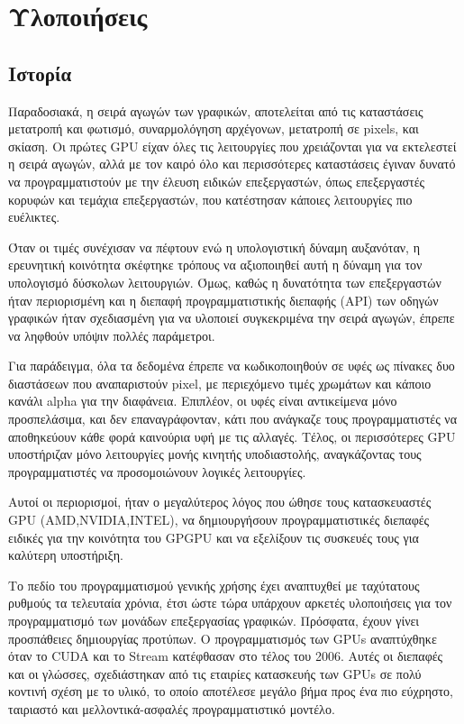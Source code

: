 \chapter{Υλοποιήσεις}
\section{Ιστορία}
Παραδοσιακά, η σειρά αγωγών των γραφικών, αποτελείται από τις καταστάσεις μετατροπή και φωτισμό, συναρμολόγηση αρχέγονων, μετατροπή σε pixels, και σκίαση. Οι πρώτες GPU είχαν όλες τις λειτουργίες που χρειάζονται για να εκτελεστεί η σειρά αγωγών, αλλά με τον καιρό όλο και περισσότερες καταστάσεις έγιναν δυνατό να προγραμματιστούν με την έλευση ειδικών επεξεργαστών, όπως επεξεργαστές κορυφών και τεμάχια επεξεργαστών, που κατέστησαν κάποιες λειτουργίες πιο ευέλικτες.

Όταν οι τιμές συνέχισαν να πέφτουν ενώ η υπολογιστική δύναμη αυξανόταν, η ερευνητική κοινότητα σκέφτηκε τρόπους να αξιοποιηθεί αυτή η δύναμη για τον υπολογισμό δύσκολων λειτουργιών. Όμως, καθώς η δυνατότητα των επεξεργαστών ήταν περιορισμένη και η διεπαφή προγραμματιστικής διεπαφής (API) των οδηγών γραφικών ήταν σχεδιασμένη για να υλοποιεί συγκεκριμένα την σειρά αγωγών, έπρεπε να ληφθούν υπόψιν πολλές παράμετροι.

Για παράδειγμα, όλα τα δεδομένα έπρεπε να κωδικοποιηθούν σε υφές ως πίνακες δυο διαστάσεων που αναπαριστούν pixel, με περιεχόμενο τιμές χρωμάτων και κάποιο κανάλι alpha για την διαφάνεια. Επιπλέον, οι υφές είναι αντικείμενα μόνο προσπελάσιμα, και δεν επαναγράφονταν, κάτι που ανάγκαζε τους προγραμματιστές να αποθηκεύουν κάθε φορά καινούρια υφή με τις αλλαγές. Τέλος, οι περισσότερες GPU υποστήριζαν μόνο λειτουργίες μονής κινητής υποδιαστολής, αναγκάζοντας τους προγραμματιστές να προσομοιώνουν λογικές λειτουργίες.

Αυτοί οι περιορισμοί, ήταν ο μεγαλύτερος λόγος που ώθησε τους κατασκευαστές GPU (AMD,NVIDIA,INTEL), να δημιουργήσουν προγραμματιστικές διεπαφές ειδικές για την κοινότητα του GPGPU και να εξελίξουν τις συσκευές τους για καλύτερη υποστήριξη.

Το πεδίο του προγραμματισμού γενικής χρήσης έχει αναπτυχθεί με ταχύτατους ρυθμούς τα τελευταία χρόνια, έτσι ώστε τώρα υπάρχουν αρκετές υλοποιήσεις για τον προγραμματισμό των μονάδων επεξεργασίας γραφικών. Πρόσφατα, έχουν γίνει προσπάθειες δημιουργίας προτύπων.
Ο προγραμματισμός των GPUs αναπτύχθηκε όταν το CUDA και το Stream κατέφθασαν στο τέλος του 2006. Αυτές οι διεπαφές και οι γλώσσες, σχεδιάστηκαν από τις εταιρίες κατασκευής των GPUs σε πολύ κοντινή σχέση με το υλικό, το οποίο αποτέλεσε μεγάλο βήμα προς ένα πιο εύχρηστο, ταιριαστό και μελλοντικά-ασφαλές προγραμματιστικό μοντέλο.

